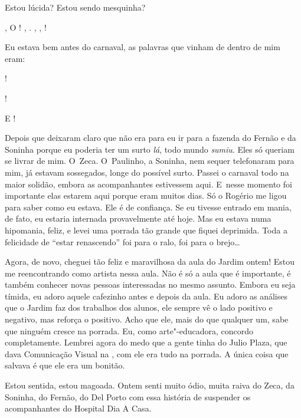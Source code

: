 Estou lúcida? Estou sendo mesquinha?

  ,   O  !  , 
. , , !

Eu estava bem antes do carnaval, as palavras que vinham de dentro de mim
eram:

!

 !

            E 
  !

Depois que deixaram claro que não era para eu ir para a fazenda do
Fernão e da Soninha porque eu poderia ter um surto \emph{lá}, todo mundo
\emph{sumiu}. Eles só queriam se livrar de mim. O~Zeca. O~Paulinho, a
Soninha, nem sequer telefonaram para mim, já estavam sossegados, longe
do possível surto. Passei o carnaval todo na maior solidão, embora as
acompanhantes estivessem aqui. E~nesse momento foi importante elas
estarem aqui porque eram muitos dias. Só o Rogério me ligou para saber
como eu estava. Ele é de confiança. Se eu tivesse entrado em mania, de
fato, eu estaria internada provavelmente até hoje. Mas eu estava numa
hipomania, feliz, e levei uma porrada tão grande que fiquei deprimida.
Toda a felicidade de ``estar renascendo'' foi para o ralo, foi para o
brejo…

Agora, de novo, cheguei tão feliz e maravilhosa da aula do Jardim ontem!
Estou me reencontrando como artista nessa aula. Não é só a aula que é
importante, é também conhecer novas pessoas interessadas no mesmo
assunto. Embora eu seja tímida, eu adoro aquele cafezinho antes e depois
da aula. Eu adoro as análises que o Jardim faz dos trabalhos dos alunos,
ele sempre vê o lado positivo e negativo, mas reforça o positivo. Acho
que ele, mais do que qualquer um, sabe que ninguém cresce na porrada.
Eu, como arte"-educadora, concordo completamente. Lembrei agora do medo
que a gente tinha do Julio Plaza, que dava Comunicação Visual na ,
com ele era tudo na porrada. A única coisa que salvava é que ele era um
bonitão.

Estou sentida, estou magoada. Ontem senti muito ódio, muita raiva do
Zeca, da Soninha, do Fernão, do Del Porto com essa história de suspender
os acompanhantes do Hospital Dia A Casa.

